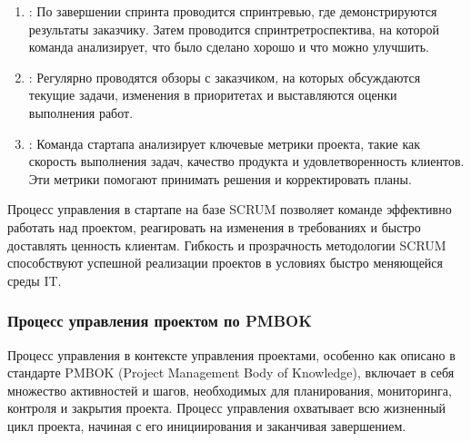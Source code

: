 \documentclass[letterpaper,10pt,russian]{sphinxmanual}
\begin{document}
\begin{enumerate}
\item {} 
\sphinxAtStartPar
{}:
По завершении спринта проводится спринт\sphinxhyphen{}ревью, где демонстрируются результаты заказчику. Затем проводится спринт\sphinxhyphen{}ретроспектива, на которой команда анализирует, что было сделано хорошо и что можно улучшить.

\item {} 
\sphinxAtStartPar
{}:
Регулярно проводятся обзоры с заказчиком, на которых обсуждаются текущие задачи, изменения в приоритетах и выставляются оценки выполнения работ.

\item {} 
\sphinxAtStartPar
{}:
Команда стартапа анализирует ключевые метрики проекта, такие как скорость выполнения задач, качество продукта и удовлетворенность клиентов. Эти метрики помогают принимать решения и корректировать планы.

\end{enumerate}

\sphinxAtStartPar
Процесс управления в стартапе на базе SCRUM позволяет команде эффективно работать над проектом, реагировать на изменения в требованиях и быстро доставлять ценность клиентам. Гибкость и прозрачность методологии SCRUM способствуют успешной реализации проектов в условиях быстро меняющейся среды IT.


\subsubsection{Процесс управления проектом по PMBOK}
\label{\detokenize{educational_materials/team_work_on_a_project/content:pmbok}}
\sphinxAtStartPar
Процесс управления в контексте управления проектами, особенно как описано в стандарте PMBOK (Project Management Body of Knowledge), включает в себя множество активностей и шагов, необходимых для планирования, мониторинга, контроля и закрытия проекта. Процесс управления охватывает всю жизненный цикл проекта, начиная с его инициирования и заканчивая завершением.
\end{document}
